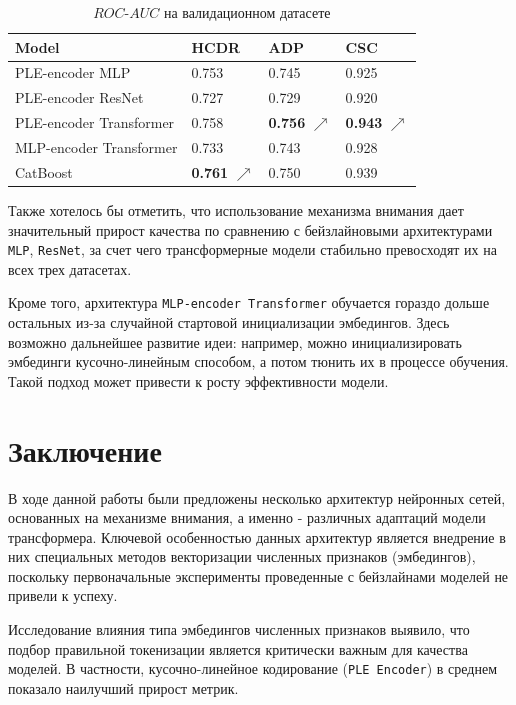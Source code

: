 \documentclass[12pt]{article}
\begin{document}
\begin{table}[h]
    \centering
    \caption{$\textit{ROC-AUC}$ на валидационном датасете}
    \vspace{2pt}

    \begin{tabular}{llll}
        \hline
        Model & HCDR & ADP & CSC \\
        \hline
        PLE-encoder MLP & 0.753 & 0.745 & 0.925 \\
        PLE-encoder ResNet & 0.727 & 0.729 & 0.920 \\
        PLE-encoder Transformer & 0.758 & \textbf{0.756} \textcolor{OliveGreen}{$\nearrow$} & \textbf{0.943} \textcolor{OliveGreen}{$\nearrow$} \\
        MLP-encoder Transformer & 0.733 & 0.743 & 0.928 \\
        CatBoost & \textbf{0.761} \textcolor{OliveGreen}{$\nearrow$} & 0.750 & 0.939 \\
        \hline
    \end{tabular} 
    \label{tab:plain}
\end{table}

Также хотелось бы отметить, что использование механизма внимания дает значительный прирост качества по сравнению с бейзлайновыми архитектурами \texttt{MLP}, \texttt{ResNet}, за счет чего трансформерные модели стабильно превосходят их на всех трех датасетах. 

Кроме того, архитектура \texttt{MLP-encoder Transformer} обучается гораздо дольше остальных из-за случайной стартовой инициализации эмбедингов. Здесь возможно дальнейшее развитие идеи: например, можно инициализировать эмбединги кусочно-линейным способом, а потом тюнить их в процессе обучения. Такой подход может привести к росту эффективности модели.

\newpage 
\section{Заключение}
В ходе данной работы были предложены несколько архитектур нейронных сетей, основанных на механизме внимания, а именно - различных адаптаций модели трансформера. Ключевой особенностью данных архитектур является внедрение в них специальных методов векторизации численных признаков (эмбедингов), поскольку первоначальные эксперименты проведенные с бейзлайнами моделей не привели к успеху.

Исследование влияния типа эмбедингов численных признаков выявило, что подбор правильной токенизации является критически важным для качества моделей. В частности, кусочно-линейное кодирование (\texttt{PLE Encoder}) в среднем показало наилучший прирост метрик.
\end{document}
